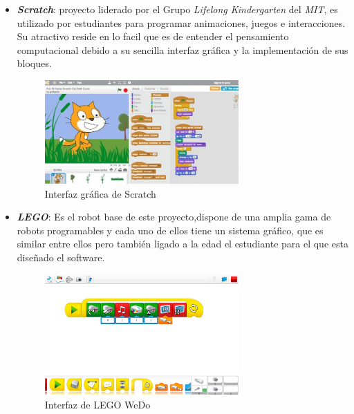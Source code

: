 \begin{itemize}
    \item \textit{\textbf{Scratch}}\cite{bib:scratch}: proyecto liderado por el Grupo \textit{Lifelong Kindergarten} del \textit{MIT}, es utilizado por estudiantes para programar animaciones, juegos e interacciones. Su atractivo reside en lo facil que es de entender el pensamiento computacional debido a su sencilla interfaz gráfica y la implementación de sus bloques.
    \begin{figure}[H]
    \centering
    \includegraphics[width=0.7\textwidth]{img/scratch.jpg}
    \caption{Interfaz gráfica de Scratch} \label{fig:scratch}
    \end{figure}

    \item \textit{\textbf{LEGO}}\cite{bib:lego}: Es el robot base de este proyecto,dispone de una amplia gama de robots programables y cada uno de ellos tiene un sistema gráfico, que es similar entre ellos pero también ligado a la edad el estudiante para el que esta diseñado el software. 

    \begin{figure}[H]
    \centering
    \includegraphics[width=0.7\textwidth]{img/lego1.png}
    \caption{Interfaz de LEGO WeDo} \label{fig:lego1}
    \end{figure}
    

\end{itemize}
